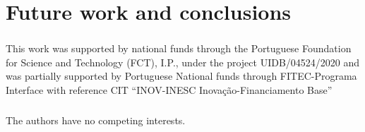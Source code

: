 \documentclass[runningheads]{llncs}
\begin{document}




\section{Future work and conclusions}
\label{sec:conclusions}

\begin{credits}
\subsubsection{\ackname} This work was supported by national funds through the Portuguese Foundation for Science and Technology (FCT), I.P., under the project UIDB/04524/2020 and was partially supported by Portuguese National funds through FITEC-Programa Interface with reference CIT “INOV-INESC Inovação-Financiamento Base”

\subsubsection{\discintname}
The authors have no competing interests.
\end{credits}
%
%
%


%
\end{document}
